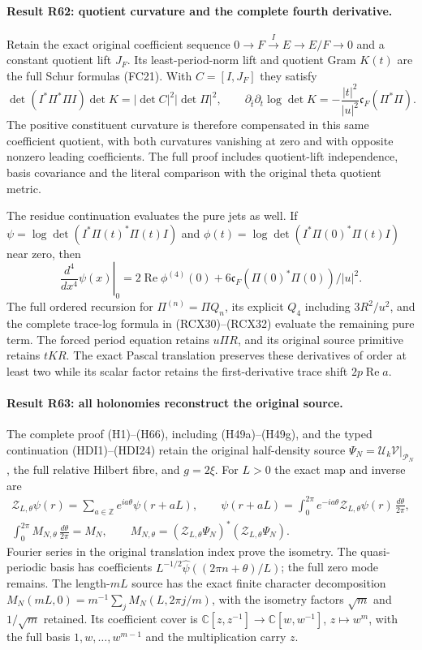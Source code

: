 \paragraph{Result R62: quotient curvature and the complete fourth derivative.}
Retain the exact original coefficient sequence
$0\to F\xrightarrow I E\to E/F\to0$ and a constant quotient lift
$J_F$. Its least-period-norm lift and quotient Gram $K(t)$ are the
full Schur formulas (FC21). With $C=[I,J_F]$ they satisfy
\[
 \det(I^*\Pi^*\Pi I)\det K
      =|\det C|^2|\det\Pi|^2,
 \qquad
 \partial_{\bar t}\partial_t\log\det K
      =-\frac{|t|^2}{|u|^2}\mathfrak c_F(\Pi^*\Pi).
\]
The positive constituent curvature is therefore compensated in this
same coefficient quotient, with both curvatures vanishing at zero
and with opposite nonzero leading coefficients. The full proof
includes quotient-lift independence, basis covariance and the
literal comparison with the original theta quotient metric.

The residue continuation evaluates the pure jets as well. If
$\psi=\log\det(I^*\Pi(t)^*\Pi(t)I)$ and
$\phi(t)=\log\det(I^*\Pi(0)^*\Pi(t)I)$ near zero, then
\[
 \left.\frac{d^4}{dx^4}\psi(x)\right|_0
   =2\operatorname{Re}\phi^{(4)}(0)
       +6\mathfrak c_F(\Pi(0)^*\Pi(0))/|u|^2.
\]
The full ordered recursion for $\Pi^{(n)}=\Pi Q_n$, its explicit
$Q_4$ including $3R^2/u^2$, and the complete trace-log formula in
(RCX30)--(RCX32) evaluate the remaining pure term. The forced
period equation retains $u\Pi R$, and its original source
primitive retains $tKR$. The exact Pascal translation preserves
these derivatives of order at least two while its scalar factor
retains the first-derivative trace shift $2p\operatorname{Re}a$.


\paragraph{Result R63: all holonomies reconstruct the original source.}
The complete proof (H1)--(H66), including (H49a)--(H49g), and the
typed continuation (HDI1)--(HDI24) retain the original half-density
source $\Psi_N=\mathcal U_k\mathcal V|_{\mathcal P_N}$, the full
relative Hilbert fibre, and $g=2\xi$. For $L>0$ the exact map and
inverse are
\[
\begin{gathered}
 \mathcal Z_{L,\theta}\psi(r)=
       \sum_{a\in\mathbb Z}e^{ia\theta}\psi(r+aL),\qquad
 \psi(r+aL)=\int_0^{2\pi}e^{-ia\theta}
       \mathcal Z_{L,\theta}\psi(r)\,\frac{d\theta}{2\pi},\\
 \int_0^{2\pi}M_{N,\theta}\,\frac{d\theta}{2\pi}=M_N,
 \qquad M_{N,\theta}=(\mathcal Z_{L,\theta}\Psi_N)^*
                             (\mathcal Z_{L,\theta}\Psi_N).
\end{gathered}
\]
Fourier series in the original translation index prove the isometry.
The quasi-periodic basis has coefficients
$L^{-1/2}\widehat\psi((2\pi n+\theta)/L)$; the full zero mode
remains. The length-$mL$ source has the exact finite character
decomposition $M_N(mL,0)=m^{-1}\sum_jM_N(L,2\pi j/m)$,
with the isometry factors $\sqrt m$ and $1/\sqrt m$ retained.
Its coefficient cover is $\mathbb C[z,z^{-1}]\to
\mathbb C[w,w^{-1}]$, $z\mapsto w^m$, with the full basis
$1,w,\ldots,w^{m-1}$ and the multiplication carry $z$.

